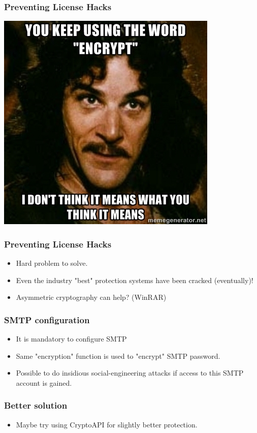 \documentclass{beamer}
\begin{document}
\begin{frame}
	\frametitle{Preventing License Hacks}
	\begin{center}
		\includegraphics[scale=0.7]{meme-encrypt}
	\end{center}
\end{frame}

\begin{frame}
	\frametitle{Preventing License Hacks}
	\begin{itemize}
		\item Hard problem to solve.
		\item Even the industry "best" protection systems have been cracked (eventually)!
		\item Asymmetric cryptography can help? (WinRAR)
	\end{itemize}
\end{frame}

\begin{frame}
	\frametitle{SMTP configuration}
	\begin{itemize}
		\item It is mandatory to configure SMTP
		\item Same "encryption" function is used to "encrypt" SMTP password.
		\item Possible to do insidious social-engineering attacks if access
		to this SMTP account is gained.
	\end{itemize}
\end{frame}


\begin{frame}
	\frametitle{Better solution}
	\begin{itemize}
		\item Maybe try using CryptoAPI for slightly
		better protection.
	\end{itemize}
\end{frame}
\end{document}

